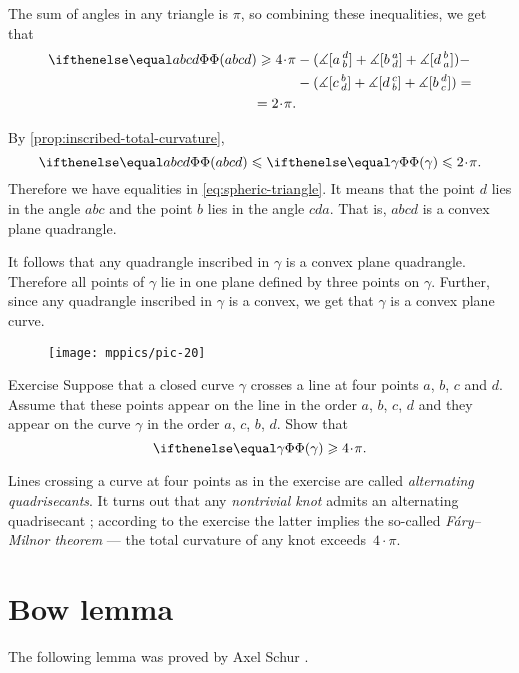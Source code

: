 The sum of angles in any triangle is $\pi$, so combining these inequalities, we get that 
\begin{align*}
\tc{abcd}\ge 4\cdot \pi 
&- (\measuredangle\hinge adb+\measuredangle\hinge bad+ 
\measuredangle\hinge dba)-
\\
&-(\measuredangle\hinge cbd+\measuredangle\hinge dcb 
+\measuredangle\hinge  bdc)=
\\
=2\cdot\pi.&
\end{align*}

By \ref{prop:inscribed-total-curvature},
\[\tc{abcd}\le \tc\gamma\le 2\cdot\pi.\]
Therefore we have equalities in \ref{eq:spheric-triangle}.
It means that the point $d$ lies in the angle $abc$ 
and the point $b$ lies in the angle $cda$.
That is, $abcd$ is a convex plane quadrangle.

It follows that any quadrangle inscribed in $\gamma$ is a convex plane quadrangle.
Therefore all points of $\gamma$ lie in one plane defined by three points on $\gamma$.
Further, since any quadrangle inscribed in $\gamma$ is a convex,
we get that $\gamma$ is a convex plane curve. 
\qeds

\begin{wrapfigure}{r}{30 mm}
\vskip-0mm
\centering
\texttt{[image: mppics/pic-20]}
\vskip0mm
\end{wrapfigure}

\begin{thm}{Exercise}\label{ex:quadrisecant}
Suppose that a closed curve $\gamma$ crosses a line at four points $a$, $b$, $c$ and $d$.
Assume that these points appear on the line in the order $a$, $b$, $c$, $d$
and they appear on the curve $\gamma$ in the order $a$, $c$, $b$, $d$.
Show that 
\[\tc\gamma\ge 4\cdot\pi.\]

\end{thm}

Lines crossing a curve at four points as in the exercise are called \emph{alternating quadrisecants}.
It turns out that any {}\emph{nontrivial knot} admits an alternating quadrisecant \cite{denne};
according to the exercise the latter implies the so-called \emph{F\'ary--Milnor theorem} --- the total curvature of any knot exceeds~$4\cdot \pi$.

\section{Bow lemma}

The following lemma was proved by Axel Schur \cite{shur}.

